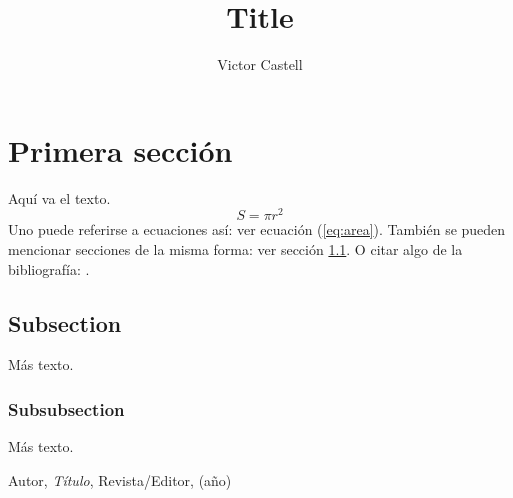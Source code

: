 \documentclass[12pt]{article}
\title{Title}
\author{Victor Castell}
\theoremstyle{definition}
\theoremstyle{remark}
\begin{document}
\maketitle


\section{Primera sección}

Aquí va el texto.
\begin{equation}\label{eq:area}
  S = \pi r^2
\end{equation}
Uno puede referirse a ecuaciones así: ver ecuación (\ref{eq:area}).
También se pueden mencionar secciones de la misma forma: ver sección
\ref{sec:nada}. O citar algo de la bibliografía: \cite{Cd94}.

\subsection{Subsection}\label{sec:nada}

Más texto.

\subsubsection{Subsubsection}\label{sec:nada2}

Más texto.

\begin{thebibliography}{99}

 Autor, \emph{Título}, Revista/Editor, (año)

\end{thebibliography}
\end{document}
